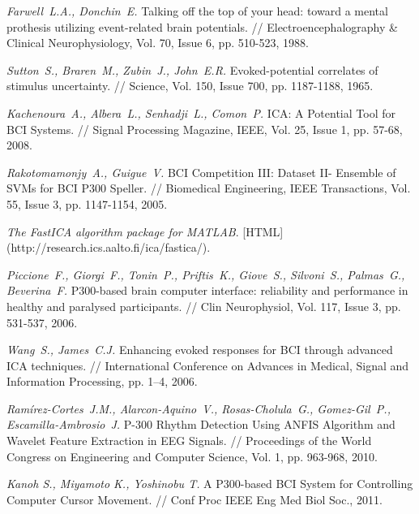 \documentclass[12pt,a4paper,oneside,fleqn,leqno]{article}
\newcounter{pe} %
\begin{document}
\newpage

\renewcommand{\bibname}{Список литературы}
\addcontentsline{toc}{section}{\bibname}


\def\BibUrl#1.{}\def\BibAnnote#1.{}


\begin{thebibliography}{1}

{\it Farwell~L.A., Donchin~E.} Talking off the top of your head: toward a mental prothesis utilizing event-related brain potentials. // Electroencephalography \& Clinical Neurophysiology, Vol. 70, Issue 6, pp. 510-523, 1988.

{\it Sutton~S., Braren~M., Zubin~J., John~E.R.} Evoked-potential correlates of stimulus uncertainty. // Science, Vol. 150,  Issue 700, pp. 1187-1188, 1965.

{\it Kachenoura~A., Albera~L., Senhadji~L., Comon~P.} ICA: A Potential Tool for BCI Systems. // Signal Processing Magazine, IEEE, Vol. 25, Issue 1, pp. 57-68, 2008.

{\it Rakotomamonjy~A., Guigue~V.} BCI Competition III: Dataset II- Ensemble of SVMs for BCI P300 Speller. // Biomedical Engineering, IEEE Transactions, Vol. 55, Issue 3, pp. 1147-1154, 2005.

\emph{The FastICA algorithm package for MATLAB}.
[HTML] (http://research.ics.aalto.fi/ica/fastica/).

{\it Piccione~F., Giorgi~F., Tonin~P., Priftis~K., Giove~S., Silvoni~S., Palmas~G., Beverina~F.} P300-based brain computer interface: reliability and performance in healthy and paralysed participants. // Clin Neurophysiol, Vol. 117, Issue 3, pp. 531-537, 2006.

{\it Wang~S., James~C.J.} Enhancing evoked responses for BCI through advanced ICA techniques. // International Conference on Advances in Medical, Signal and Information Processing, pp. 1--4, 2006.

{\it Ramírez-Cortes~J.M., Alarcon-Aquino~V., Rosas-Cholula~G., Gomez-Gil~P., Escamilla-Ambrosio~J.} P-300 Rhythm Detection Using ANFIS Algorithm and Wavelet Feature Extraction in EEG Signals. // Proceedings of the World Congress on Engineering and Computer Science, Vol. 1,  pp. 963-968, 2010.

{\it Kanoh S., Miyamoto K., Yoshinobu T.} A P300-based BCI System for Controlling Computer Cursor Movement. // Conf Proc IEEE Eng Med Biol Soc., 2011.


\end{thebibliography}
\end{document}
